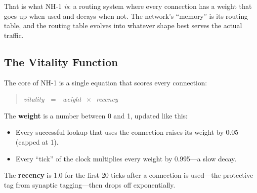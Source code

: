 \documentclass[nobib]{tufte-handout}
\begin{document}
That is what NH-1 \emph{is}: a routing system where every connection has a weight that goes up when used and decays when not. The network's ``memory'' is its routing table, and the routing table evolves into whatever shape best serves the actual traffic.

\subsection{The Vitality Function}

The core of NH-1 is a single equation that scores every connection:

\begin{quote}
\centering\itshape
vitality $\;=\;$ weight $\,\times\,$ recency
\end{quote}

The \textbf{weight} is a number between 0 and 1, updated like this:
\begin{itemize}
  \item Every successful lookup that uses the connection raises its weight by 0.05 (capped at 1).
  \item Every ``tick'' of the clock multiplies every weight by 0.995---a slow decay.
\end{itemize}

The \textbf{recency} is 1.0 for the first 20 ticks after a connection is used---the protective tag from synaptic tagging---then drops off exponentially.
\end{document}
